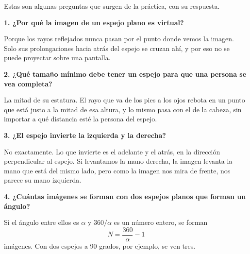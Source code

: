 Estas son algunas preguntas que surgen de la práctica, con su respuesta.

\textbf{1. ¿Por qué la imagen de un espejo plano es virtual?}

Porque los rayos reflejados nunca pasan por el punto donde vemos la imagen. Solo sus prolongaciones hacia atrás del espejo se cruzan ahí, y por eso no se puede proyectar sobre una pantalla.

\textbf{2. ¿Qué tamaño mínimo debe tener un espejo para que una persona se vea completa?}

La mitad de su estatura. El rayo que va de los pies a los ojos rebota en un punto que está justo a la mitad de esa altura, y lo mismo pasa con el de la cabeza, sin importar a qué distancia esté la persona del espejo.

\textbf{3. ¿El espejo invierte la izquierda y la derecha?}

No exactamente. Lo que invierte es el adelante y el atrás, en la dirección perpendicular al espejo. Si levantamos la mano derecha, la imagen levanta la mano que está del mismo lado, pero como la imagen nos mira de frente, nos parece su mano izquierda.

\textbf{4. ¿Cuántas imágenes se forman con dos espejos planos que forman un ángulo?}

Si el ángulo entre ellos es $\alpha$ y $360/\alpha$ es un número entero, se forman
\begin{equation}
N = \frac{360}{\alpha} - 1
\label{eq:imagenes}
\end{equation}
imágenes. Con dos espejos a 90 grados, por ejemplo, se ven tres.
